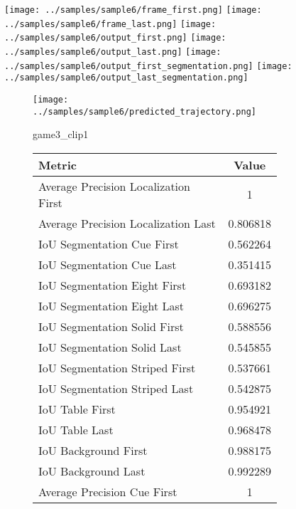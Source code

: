 \begin{figure}
    \texttt{[image: ../samples/sample6/frame\_first.png]}
    \texttt{[image: ../samples/sample6/frame\_last.png]}
    \newline
    \texttt{[image: ../samples/sample6/output\_first.png]}
    \texttt{[image: ../samples/sample6/output\_last.png]}
    \newline
    \texttt{[image: ../samples/sample6/output\_first\_segmentation.png]}
    \texttt{[image: ../samples/sample6/output\_last\_segmentation.png]}
    \newline
    \begin{subfigure}[b]{0.49\textwidth}
        \vspace{20pt}
        \texttt{[image: ../samples/sample6/predicted\_trajectory.png]}
        \caption*{game3\_clip1}
    \end{subfigure}
\begin{subfigure}[b]{0.49\textwidth}
    \begin{tabular}{|l|c|}
        \hline
        \textbf{Metric} & \textbf{Value} \\
        \hline
        Average Precision Localization First & 1 \\
        Average Precision Localization Last & 0.806818 \\
        \hline
        IoU Segmentation Cue First & 0.562264 \\
        IoU Segmentation Cue Last & 0.351415 \\
        IoU Segmentation Eight First & 0.693182 \\
        IoU Segmentation Eight Last & 0.696275 \\
        IoU Segmentation Solid First & 0.588556 \\
        IoU Segmentation Solid Last & 0.545855 \\
        IoU Segmentation Striped First & 0.537661 \\
        IoU Segmentation Striped Last & 0.542875 \\
        \hline
        IoU Table First & 0.954921 \\
        IoU Table Last & 0.968478 \\
        IoU Background First & 0.988175 \\
        IoU Background Last & 0.992289 \\
        \hline
        Average Precision Cue First & 1 \\

\end{tabular}
\end{subfigure}
\end{figure}
